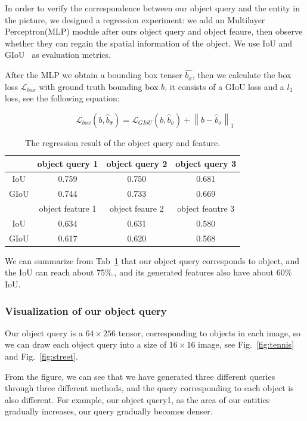 In order to verify the correspondence between our object query and the entity in the picture, we designed a regression experiment: we add an Multilayer Perceptron(MLP) module after ours object query and object feaure, then observe whether they can regain the spatial information of the object. We use IoU and GIoU~\cite{rezatofighi2019generalized}  as evaluation metrics.

After the MLP we obtain a bounding box tenser $ \hat{b_\sigma} $, then we calculate the box loss $\mathcal{L}_{box}$ with ground truth bounding box $b$, it consists of a GIoU loss and a $l_1$ loss, see the following equation:

$$ \mathcal{L}_{box}(b,\hat{b}_{\hat{\sigma}}) = \mathcal{L}_{GIoU}(b,\hat{b}_{\sigma}) + \left \| b - \hat{b}_{\sigma}  \right \| _1 $$

\begin{table}[!h]
	\centering
	\begin{tabular}{c|ccc}
		\bottomrule
		& object query 1 & object query 2 & object query 3  \\ \midrule
		IoU  & 0.759  & 0.750  & 0.681    \\
		GIoU & 0.744  & 0.733 & 0.669   \\ \bottomrule
		&object feature 1  &object feaure 2 & object feautre 3\\ \midrule
		IoU & 0.634 & 0.631 & 0.580 \\
		GIoU	& 0.617 & 0.620 & 0.568  \\\bottomrule
		
	\end{tabular}
\caption[The regression result of the object query and feature]{The regression result of the object query and feature.}
\label{tab:regresstion}
\end{table}

We can summarize from Tab~\ref{tab:regresstion} that our object query corresponds to object, and the IoU can reach about 75\%., and its  generated features also have about 60\%  IoU.

\subsubsection{Visualization of our object query}
Our object query is a $ 64 \times 256 $ tensor, corresponding to objects in each image, so we can draw each object query into a size of $16 \times 16$ image, see Fig.~\ref{fig:tennis} and Fig.~\ref{fig:street}. 

From the figure, we can see that we have generated three different queries through three different methods, and the query corresponding to each object is also different. For example, our object query1, as the area of our entities gradually increases, our query gradually becomes denser. 


